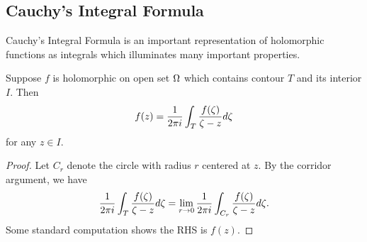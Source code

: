 \subsection{Cauchy's Integral Formula}
Cauchy's Integral Formula is an important representation of holomorphic functions as integrals which illuminates many important properties.
\begin{thm}
    Suppose $f$ is holomorphic on open set $\Omega$ which contains contour $T$ and its interior $I$. Then
    \[
        f(z) = \frac{1}{2\pi i}\int_T \frac{f(\zeta)}{\zeta - z}d\zeta
    \]
    for any $z \in I$.
\end{thm}
\begin{proof}
    Let $C_r$ denote the circle with radius $r$ centered at $z$. By the corridor argument, we have
    \[
        \frac{1}{2\pi i}\int_T \frac{f(\zeta)}{\zeta - z}d\zeta
        =
        \lim_{r \rightarrow 0} \frac{1}{2\pi i}\int_{C_r} \frac{f(\zeta)}{\zeta - z}d\zeta.
    \]
    Some standard computation shows the RHS is $f(z)$.
\end{proof}

